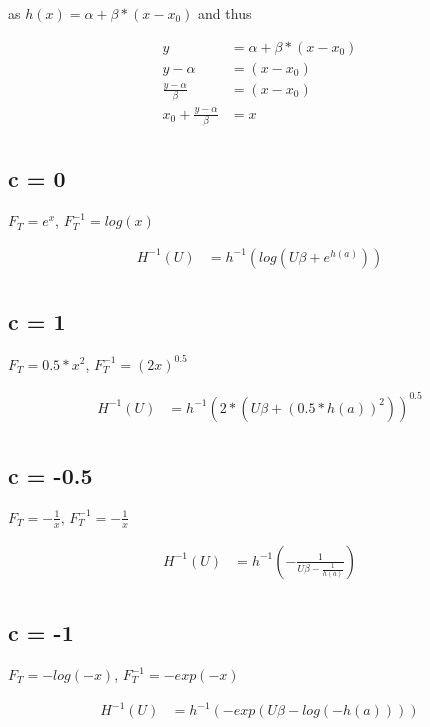 \documentclass[]{article}
\begin{document}
as $h(x) = \alpha + \beta * (x - x_0)$ and thus

\begin{align*}
y &= \alpha + \beta * (x - x_0) \\
y - \alpha &= (x - x_0) \\
\frac{y - \alpha}{\beta} &=  (x - x_0) \\
x_0 + \frac{y - \alpha}{\beta} &=  x \\
\end{align*}

\subsection{c = 0}

$F_T = e^x$, $F_T^{-1} = log(x)$

\begin{align*}
H^{-1}(U) &= h^{-1} \left( log \left( U\beta + e^{h(a)} \right) \right) \\
\end{align*}

\subsection{c = 1}

$F_T = 0.5 * x^2$, $F_T^{-1} = (2x)^{0.5}$

\begin{align*}
H^{-1}(U) &= h^{-1} \left( 2 * \left( U\beta + (0.5 *h(a))^{2} \right) \right)^{0.5} \\
\end{align*}

\subsection{c = -0.5}

$F_T = -\frac{1}{x}$, $F_T^{-1} = - \frac{1}{x}$

\begin{align*}
H^{-1}(U) &= h^{-1} \left( - \frac{1}{U\beta - \frac{1}{h(a)}} \right) \\
\end{align*}


\subsection{c = -1}

$F_T =-log(-x)$, $F_T^{-1} = -exp(-x)$

\begin{align*}
H^{-1}(U) &= h^{-1} \left( - exp \left( U\beta - log(-h(a)) \right) \right) \\
\end{align*}
\end{document}
